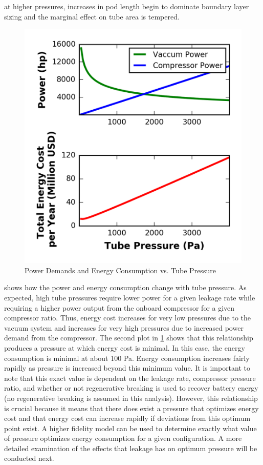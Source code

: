 at higher pressures, increases in pod length begin to dominate boundary layer
sizing and the marginal effect on tube area is tempered.
\begin{figure}
	\centering
	\includegraphics{../../images/graphs/pressure_trades/pressure_vs_power.png}
	\caption{Power Demands and Energy Consumption vs. Tube Pressure}
	\label{fig:pow_demands_vs_tube_press}
\end{figure}
 shows how the power and energy consumption
change with tube pressure. As expected, high tube pressures require lower power
for a given leakage rate while requiring a higher power output from the onboard
compressor for a given compressor ratio. Thus, energy cost increases for very
low pressures due to the vacuum system and increases for very high pressures
due to increased power demand from the compressor.
The second plot in \cref{fig:pow_demands_vs_tube_press} shows that this
relationship produces a pressure at which energy cost is minimal. In this case,
the energy consumption is minimal at about 100 Pa. Energy consumption increases
fairly rapidly as pressure is increased beyond this minimum value. It is
important to note that this exact value is dependent on the leakage rate,
compressor pressure ratio, and whether or not regenerative breaking is used to
recover battery energy (no regenerative breaking is assumed in this analysis).
However, this relationship is crucial because it means that there does exist a
pressure that optimizes energy cost and that energy cost can increase rapidly
if deviations from this optimum point exist. A higher fidelity model can be
used to determine exactly what value of pressure optimizes energy consumption
for a given configuration. A more detailed examination of the effects that
leakage has on optimum pressure will be conducted next.
